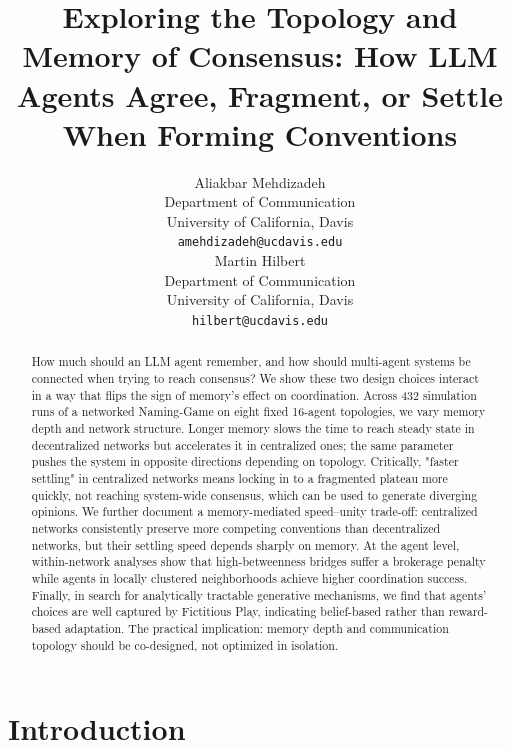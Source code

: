 \documentclass{article}
\title{Exploring the Topology and Memory of Consensus: How LLM Agents Agree, Fragment, or Settle When Forming Conventions}
\author{
  Aliakbar Mehdizadeh \\
  Department of Communication \\
  University of California, Davis \\
  \texttt{amehdizadeh@ucdavis.edu} \\
   \And
  Martin Hilbert \\
  Department of Communication \\
  University of California, Davis\\
  \texttt{hilbert@ucdavis.edu}
}
\begin{document}
\maketitle

\begin{abstract}
How much should an LLM agent remember, and how should multi-agent systems be connected when trying to reach consensus? We show these two design choices interact in a way that flips the sign of memory's effect on coordination. Across 432 simulation runs of a networked Naming-Game on eight fixed 16-agent topologies, we vary memory depth and network structure. Longer memory slows the time to reach steady state in decentralized networks but accelerates it in centralized ones; the same parameter pushes the system in opposite directions depending on topology. Critically, "faster settling" in centralized networks means locking in to a fragmented plateau more quickly, not reaching system-wide consensus, which can be used to generate diverging opinions. We further document a memory-mediated speed–unity trade-off: centralized networks consistently preserve more competing conventions than decentralized networks, but their settling speed depends sharply on memory. At the agent level, within-network analyses show that high-betweenness bridges suffer a brokerage penalty while agents in locally clustered neighborhoods achieve higher coordination success. Finally, in search for analytically tractable generative mechanisms, we find that agents' choices are well captured by Fictitious Play, indicating belief-based rather than reward-based adaptation. The practical implication: memory depth and communication topology should be co-designed, not optimized in isolation.
\end{abstract}



\section{Introduction}
\end{document}
